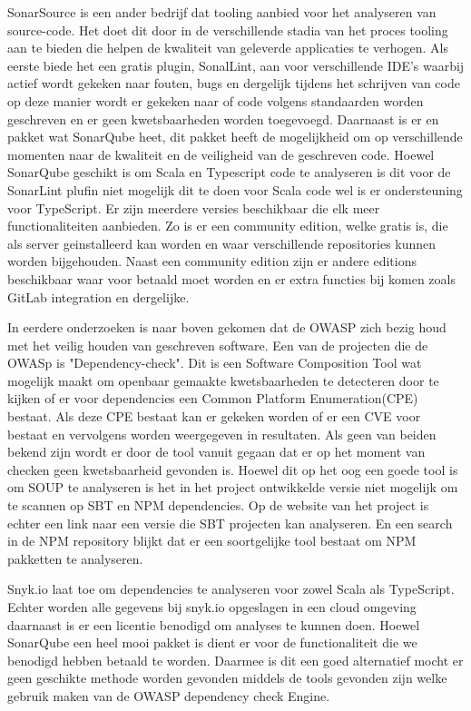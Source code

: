 SonarSource is een ander bedrijf dat tooling aanbied voor het analyseren van source-code. Het doet dit door in de verschillende stadia van het proces tooling aan te bieden die helpen de kwaliteit van geleverde applicaties te verhogen. Als eerste biede het een gratis plugin, SonalLint, aan voor verschillende IDE's waarbij actief wordt gekeken naar fouten, bugs en dergelijk tijdens het schrijven van code op deze manier wordt er gekeken naar of code volgens standaarden worden geschreven en er geen kwetsbaarheden worden toegevoegd. Daarnaast is er en pakket wat SonarQube heet, dit pakket heeft de mogelijkheid om op verschillende momenten naar de kwaliteit en de veiligheid van de geschreven code. Hoewel SonarQube geschikt is om Scala en Typescript code te analyseren is dit voor de SonarLint plufin niet mogelijk dit te doen voor Scala code wel is er ondersteuning voor TypeScript.  Er zijn meerdere versies beschikbaar die elk meer functionaliteiten aanbieden. Zo is er een community edition, welke gratis is, die als server geinstalleerd kan worden en waar verschillende repositories kunnen worden bijgehouden. Naast een community edition zijn er andere editions beschikbaar waar voor betaald moet worden en er extra functies bij komen zoals GitLab integration en dergelijke.

In eerdere onderzoeken is naar boven gekomen dat de OWASP zich bezig houd met het veilig houden van geschreven software. Een van de projecten die de OWASp is "Dependency-check". Dit is een Software Composition Tool wat mogelijk maakt om openbaar gemaakte kwetsbaarheden te detecteren door te kijken of er voor dependencies een Common Platform Enumeration(CPE) bestaat. Als deze CPE bestaat kan er gekeken worden of er een CVE voor bestaat en vervolgens worden weergegeven in resultaten. Als geen van beiden bekend zijn wordt er door de tool vanuit gegaan dat er op het moment van checken geen kwetsbaarheid gevonden is. Hoewel dit op het oog een goede tool is om SOUP te analyseren is het in het project ontwikkelde versie niet mogelijk om te scannen op SBT en NPM dependencies. Op de website van het project is echter een link naar een versie die SBT projecten kan analyseren. En een search in de NPM repository blijkt dat er een soortgelijke tool bestaat om NPM pakketten te analyseren.


Snyk.io laat toe om dependencies te analyseren voor zowel Scala als TypeScript. Echter worden alle gegevens bij snyk.io opgeslagen in een cloud omgeving daarnaast is er een licentie benodigd om analyses te kunnen doen. Hoewel SonarQube een heel mooi pakket is dient er voor de functionaliteit die we benodigd hebben betaald te worden. Daarmee is dit een goed alternatief mocht er geen geschikte methode worden gevonden middels de tools gevonden zijn welke gebruik maken van de OWASP dependency check Engine.

